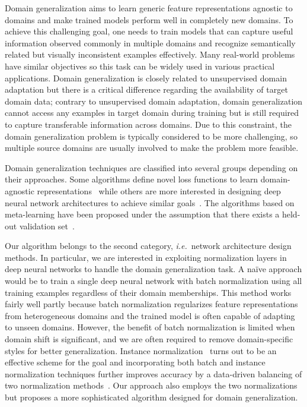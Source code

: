 \documentclass[runningheads]{llncs}
\newcommand\ie{\textit{i.e.}}
\begin{document}
Domain generalization aims to learn generic feature representations agnostic to domains and make trained models perform well in completely new domains.
To achieve this challenging goal, one needs to train models that can capture useful information observed commonly in multiple domains and recognize semantically related but visually inconsistent examples effectively.
Many real-world problems have similar objectives so this task can be widely used in various practical applications.
Domain generalization is closely related to unsupervised domain adaptation but there is a critical difference regarding the availability of target domain data; contrary to unsupervised domain adaptation, domain generalization cannot access any examples in target domain during training but is still required to capture transferable information across domains.
Due to this constraint, the domain generalization problem is typically considered to be more challenging, so multiple source domains are usually involved to make the problem more feasible.


Domain generalization techniques are classified into several groups depending on their approaches.
Some algorithms define novel loss functions to learn domain-agnostic representations~\cite{muandet2013domain,motiian2017unified,li2018domain,dou2019domain} while others are more interested in designing deep neural network architectures to achieve similar goals~\cite{pacs,dinnocente2018domain,mancini2018best}.
The algorithms based on meta-learning have been proposed under the assumption that there exists a held-out validation set~\cite{balaji2018metareg,li2019episodic,li2018learning}.


Our algorithm belongs to the second category, \ie~network architecture design methods.
In particular, we are interested in exploiting normalization layers in deep neural networks to handle the domain generalization task.
A na\"ive approach would be to train a single deep neural network with batch normalization using all training examples regardless of their domain memberships.
This method works fairly well partly because batch normalization regularizes feature representations from heterogeneous domains and the trained model is often capable of adapting to unseen domains.
However, the benefit of batch normalization is limited when domain shift is significant, and we are often required to remove domain-specific styles for better generalization.
Instance normalization~\cite{in} turns out to be an effective scheme for the goal and incorporating both  batch and instance normalization techniques further improves accuracy by a data-driven balancing of two normalization methods~\cite{bin,ibn}.
Our approach also employs the two normalizations but proposes a more sophisticated algorithm designed for domain generalization. 
\end{document}
